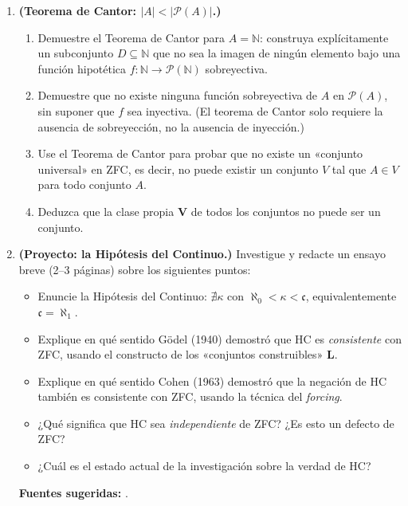 \begin{enumerate}[leftmargin=2.5em, label=\textbf{\arabic*.}]
  \item \textbf{(Teorema de Cantor: $|A| < |\mathcal{P}(A)|$.)}
  \begin{enumerate}[label=(\alph*)]
    \item Demuestre el Teorema de Cantor para $A = \mathbb{N}$: construya explícitamente un subconjunto $D \subseteq \mathbb{N}$ que no sea la imagen de ningún elemento bajo una función hipotética $f: \mathbb{N} \to \mathcal{P}(\mathbb{N})$ sobreyectiva.
    \item Demuestre que no existe ninguna función sobreyectiva de $A$ en $\mathcal{P}(A)$, sin suponer que $f$ sea inyectiva. (El teorema de Cantor solo requiere la ausencia de sobreyección, no la ausencia de inyección.)
    \item Use el Teorema de Cantor para probar que no existe un «conjunto universal» en ZFC, es decir, no puede existir un conjunto $V$ tal que $A \in V$ para todo conjunto $A$.
    \item Deduzca que la clase propia $\mathbf{V}$ de todos los conjuntos no puede ser un conjunto.
  \end{enumerate}

  \item \textbf{(Proyecto: la Hipótesis del Continuo.)}
  Investigue y redacte un ensayo breve (2--3 páginas) sobre los siguientes puntos:
  \begin{itemize}[leftmargin=2em]
    \item Enuncie la Hipótesis del Continuo: $\nexists \kappa$ con $\aleph_0 < \kappa < \mathfrak{c}$, equivalentemente $\mathfrak{c} = \aleph_1$.
    \item Explique en qué sentido Gödel (1940) demostró que HC es \emph{consistente} con ZFC, usando el constructo de los «conjuntos construibles» $\mathbf{L}$.
    \item Explique en qué sentido Cohen (1963) demostró que la negación de HC también es consistente con ZFC, usando la técnica del \emph{forcing}.
    \item ¿Qué significa que HC sea \emph{independiente} de ZFC? ¿Es esto un defecto de ZFC?
    \item ¿Cuál es el estado actual de la investigación sobre la verdad de HC?
  \end{itemize}
  \textbf{Fuentes sugeridas:} \cite{cohen1966, jech2003, kunen2011, kanamori2003}.

\end{enumerate}

